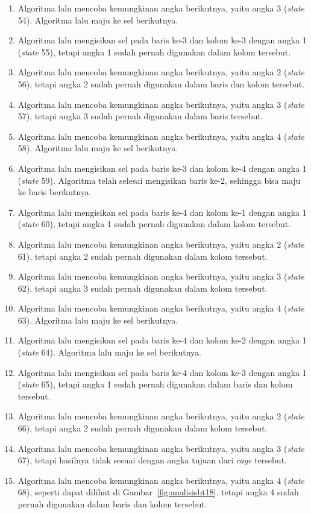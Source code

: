 \begin{enumerate}
\item Algoritma lalu mencoba kemungkinan angka berikutnya, yaitu angka 3 (\textit{state} 54). Algoritma lalu maju ke sel berikutnya.
\item Algoritma lalu mengisikan sel pada baris ke-3 dan kolom ke-3 dengan angka 1 (\textit{state} 55), tetapi angka 1 sudah pernah digunakan dalam kolom tersebut.
\item Algoritma lalu mencoba kemungkinan angka berikutnya, yaitu angka 2 (\textit{state} 56), tetapi angka 2 sudah pernah digunakan dalam baris dan kolom tersebut.
\item Algoritma lalu mencoba kemungkinan angka berikutnya, yaitu angka 3 (\textit{state} 57), tetapi angka 3 sudah pernah digunakan dalam baris tersebut.
\item Algoritma lalu mencoba kemungkinan angka berikutnya, yaitu angka 4 (\textit{state} 58). Algoritma lalu maju ke sel berikutnya.
\item Algoritma lalu mengisikan sel pada baris ke-3 dan kolom ke-4 dengan angka 1 (\textit{state} 59). Algoritma telah selesai mengisikan baris ke-2, sehingga bisa maju ke baris berikutnya.
\item Algoritma lalu mengisikan sel pada baris ke-4 dan kolom ke-1 dengan angka 1 (\textit{state} 60), tetapi angka 1 sudah pernah digunakan dalam kolom tersebut.
\item Algoritma lalu mencoba kemungkinan angka berikutnya, yaitu angka 2 (\textit{state} 61), tetapi angka 2 sudah pernah digunakan dalam kolom tersebut.
\item Algoritma lalu mencoba kemungkinan angka berikutnya, yaitu angka 3 (\textit{state} 62), tetapi angka 3 sudah pernah digunakan dalam kolom tersebut.
\item Algoritma lalu mencoba kemungkinan angka berikutnya, yaitu angka 4 (\textit{state} 63). Algoritma lalu maju ke sel berikutnya.
\item Algoritma lalu mengisikan sel pada baris ke-4 dan kolom ke-2 dengan angka 1 (\textit{state} 64). Algoritma lalu maju ke sel berikutnya.
\item Algoritma lalu mengisikan sel pada baris ke-4 dan kolom ke-3 dengan angka 1 (\textit{state} 65), tetapi angka 1 sudah pernah digunakan dalam baris dan kolom tersebut.
\item Algoritma lalu mencoba kemungkinan angka berikutnya, yaitu angka 2 (\textit{state} 66), tetapi angka 2 sudah pernah digunakan dalam kolom tersebut.
\item Algoritma lalu mencoba kemungkinan angka berikutnya, yaitu angka 3 (\textit{state} 67), tetapi hasilnya tidak sesuai dengan angka tujuan dari \textit{cage} tersebut.
\item Algoritma lalu mencoba kemungkinan angka berikutnya, yaitu angka 4 (\textit{state} 68), seperti dapat dilihat di Gambar~\ref{fig:analisisbt18}. tetapi angka 4 sudah pernah digunakan dalam baris dan kolom tersebut.


\end{enumerate}
